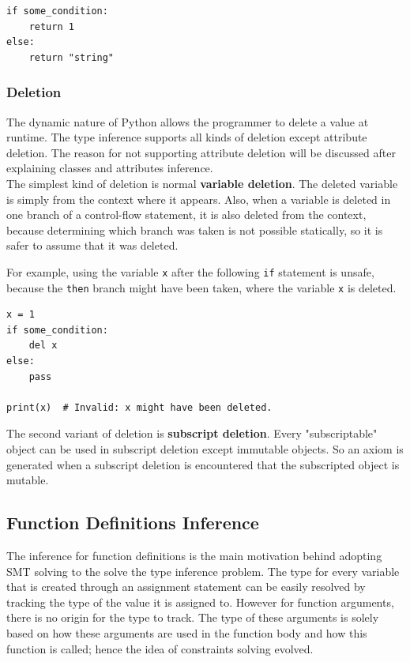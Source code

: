 \begin{lstlisting}
if some_condition:
	return 1
else:
	return "string"
\end{lstlisting}


\subsubsection{Deletion}
The dynamic nature of Python allows the programmer to delete a value at runtime. The type inference supports all kinds of deletion except attribute deletion. The reason for not supporting attribute deletion will be discussed after explaining classes and attributes inference.\\

The simplest kind of deletion is normal \textbf{variable deletion}. The deleted variable is simply from the context where it appears. Also, when a variable is deleted in one branch of a control-flow statement, it is also deleted from the context, because determining which branch was taken is not possible statically, so it is safer to assume that it was deleted.

For example, using the variable \lstinline|x| after the following \lstinline|if| statement is unsafe, because the \lstinline|then| branch might have been taken, where the variable \lstinline|x| is deleted.
\begin{lstlisting}
x = 1
if some_condition:
	del x
else:
	pass
	
print(x)  # Invalid: x might have been deleted.
\end{lstlisting}

The second variant of deletion is \textbf{subscript deletion}. Every "subscriptable" object can be used in subscript deletion except immutable objects. So an axiom is generated when a subscript deletion is encountered that the subscripted object is mutable.
\subsection{Function Definitions Inference}
The inference for function definitions is the main motivation behind adopting SMT solving to the solve the type inference problem. The type for every variable that is created through an assignment statement can be easily resolved by tracking the type of the value it is assigned to. However for function arguments, there is no origin for the type to track. The type of these arguments is solely based on how these arguments are used in the function body and how this function is called; hence the idea of constraints solving evolved.\\

